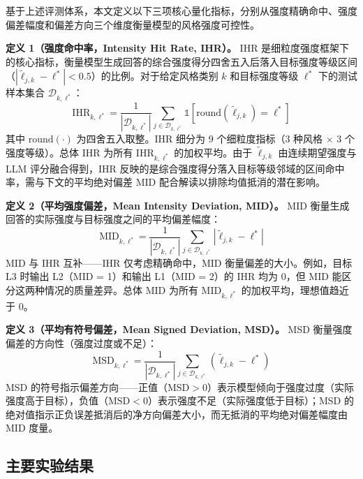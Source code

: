 \documentclass[fontset=fandol,type=master,campus=shenzhen,etitleauto=true]{hithesisbook}
\begin{document}
基于上述评测体系，本文定义以下三项核心量化指标，分别从强度精确命中、强度偏差幅度和偏差方向三个维度衡量模型的风格强度可控性。

\textbf{定义 1（强度命中率，Intensity Hit Rate, IHR）。} IHR 是细粒度强度框架下的核心指标，衡量模型生成回答的综合强度得分四舍五入后落入目标强度等级区间（$|\tilde{\ell}_{j,k} - \ell^*| < 0.5$）的比例。对于给定风格类别 $k$ 和目标强度等级 $\ell^*$ 下的测试样本集合 $\mathcal{D}_{k,\ell^*}$：
\begin{equation}
\text{IHR}_{k,\ell^*} = \frac{1}{|\mathcal{D}_{k,\ell^*}|} \sum_{j \in \mathcal{D}_{k,\ell^*}} \mathbb{1}\left[\text{round}(\tilde{\ell}_{j,k}) = \ell^*\right]
\end{equation}
其中 $\text{round}(\cdot)$ 为四舍五入取整。IHR 细分为 9 个细粒度指标（3 种风格 × 3 个强度等级）。总体 IHR 为所有 $\text{IHR}_{k,\ell^*}$ 的加权平均。由于 $\tilde{\ell}_{j,k}$ 由连续期望强度与 LLM 评分融合得到，IHR 反映的是综合强度得分落入目标等级邻域的区间命中率，需与下文的平均绝对偏差 MID 配合解读以排除均值抵消的潜在影响。

\textbf{定义 2（平均强度偏差，Mean Intensity Deviation, MID）。} MID 衡量生成回答的实际强度与目标强度之间的平均偏差幅度：
\begin{equation}
\text{MID}_{k,\ell^*} = \frac{1}{|\mathcal{D}_{k,\ell^*}|} \sum_{j \in \mathcal{D}_{k,\ell^*}} |\tilde{\ell}_{j,k} - \ell^*|
\end{equation}
MID 与 IHR 互补------IHR 仅考虑精确命中，MID 衡量偏差的大小。例如，目标 L3 时输出 L2（MID = 1）和输出 L1（MID = 2）的 IHR 均为 0，但 MID 能区分这两种情况的质量差异。总体 MID 为所有 $\text{MID}_{k,\ell^*}$ 的加权平均，理想值趋近于 0。

\textbf{定义 3（平均有符号偏差，Mean Signed Deviation, MSD）。} MSD 衡量强度偏差的方向性（强度过度或不足）：
\begin{equation}
\text{MSD}_{k,\ell^*} = \frac{1}{|\mathcal{D}_{k,\ell^*}|} \sum_{j \in \mathcal{D}_{k,\ell^*}} (\tilde{\ell}_{j,k} - \ell^*)
\end{equation}
MSD 的符号指示偏差方向------正值（$\text{MSD} > 0$）表示模型倾向于强度过度（实际强度高于目标），负值（$\text{MSD} < 0$）表示强度不足（实际强度低于目标）；MSD 的绝对值指示正负误差抵消后的净方向偏差大小，而无抵消的平均绝对偏差幅度由 MID 度量。

\subsection{主要实验结果}\label{ux4e3bux8981ux7ed3ux679c-1}
\end{document}
